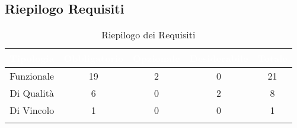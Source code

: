 \subsection{Riepilogo Requisiti}\label{Riepilogo}
\begin{center}
\begin{longtable}[c]{|c|c|c|c|c|}
\hline
\rowcolor{bluelogo}\textbf{\textcolor{white}{Tipologia}} & \textbf{\textcolor{white}{Obbligatorio}} & \textbf{\textcolor{white}{Opzionale}} & \textbf{\textcolor{white}{Desiderabile}} & \textbf{\textcolor{white}{Totale}}\\
\hline \hline
\endhead
Funzionale & 19 & 2 & 0 & 21\\
\hline
\rowcolor{grigio}Di Qualità & 6 & 0 & 2 & 8\\
\hline
Di Vincolo & 1 & 0 & 0 & 1\\
\hline
\caption{Riepilogo dei Requisiti}
\end{longtable}
\end{center}